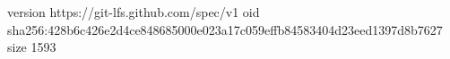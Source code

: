 version https://git-lfs.github.com/spec/v1
oid sha256:428b6c426e2d4ce848685000e023a17c059effb84583404d23eed1397d8b7627
size 1593
